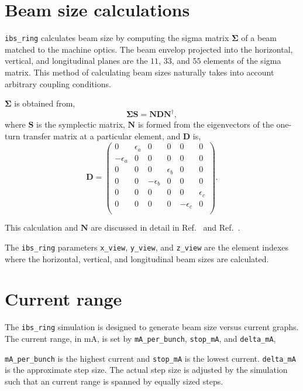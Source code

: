 \documentclass[11pt]{article}
\begin{document}
\section{Beam size calculations}
{\tt ibs_ring} calculates beam size by computing the sigma matrix $\mathbf{\Sigma}$ 
of a beam matched to the machine optics.  
The beam envelop projected into the horizontal, vertical, and longitudinal planes
are the $11$, $33$, and $55$ elements of the sigma matrix.  This method of calculating
beam sizes naturally takes into account arbitrary coupling conditions.

$\mathbf{\Sigma}$ is obtained
from,
\begin{equation}
\mathbf{\Sigma S}=\mathbf{NDN}^\dagger,
\end{equation}
where $\mathbf{S}$ is the symplectic matrix, $\mathbf{N}$ is formed from the
eigenvectors of the one-turn transfer matrix at a particular element,
and $\mathbf{D}$ is,
\begin{equation}
\mathbf{D}=\begin{pmatrix}
0&\epsilon_a&0&0&0&0\\
-\epsilon_a&0&0&0&0&0\\
0&0&0&\epsilon_b&0&0\\
0&0&-\epsilon_b&0&0&0\\
0&0&0&0&0&\epsilon_c\\
0&0&0&0&-\epsilon_c&0\\
\end{pmatrix}.
\end{equation}

This calculation and $\mathbf{N}$ are discussed in detail in Ref.~\cite{b:prst-crab}
and Ref.~\cite{b:wolski-N}.

The {\tt ibs_ring} parameters {\tt x_view}, {\tt y_view}, and {\tt z_view}
are the element indexes
where the horizontal, vertical, and longitudinal beam sizes are calculated.

\section{Current range}
The {\tt ibs_ring} simulation is designed to generate beam size versus current graphs.
The current range, in mA, is set by {\tt mA_per_bunch}, {\tt stop_mA}, and {\tt delta_mA},

{\tt mA_per_bunch} is the highest current and {\tt stop_mA} is the lowest current.
{\tt delta_mA} is the approximate step size.  The actual step size is adjusted by the simulation
such that an current range is spanned by equally sized steps.
\end{document}

